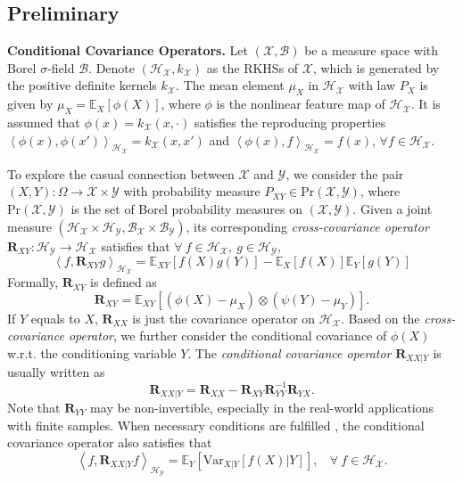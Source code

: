 \documentclass[final]{cvpr}
\newcommand{\MC}{\mathcal}
\newcommand{\MBB}{\mathbb}
\newcommand{\MBF}{\mathbf}
\begin{document}
\subsection{Preliminary}

\textbf{Conditional Covariance Operators. }
Let $(\MC{X},\MC{B})$ be a measure space with Borel $\sigma$-field $\MC{B}$. Denote $(\MC{H}_{\MC{X}},k_{\MC{X}})$ as the RKHSs of $\MC{X}$, which is generated by the positive definite kernels $k_{\MC{X}}$. The mean element $\mu_{X}$ in $\MC{H}_\MC{X}$ with law $P_X$ is given by $\mu_{X} = \MBB{E}_X \left[ \phi(X) \right]$, where $\phi$ is the nonlinear feature map of $\MC{H}_{\MC{X}}$. It is assumed that $\phi(x)=k_{\MC{X}}(x,\cdot)$ satisfies the reproducing properties $\left<\phi(x),\phi(x')\right>_{\MC{H}_{\MC{X}}}=k_{\MC{X}}(x,x')$ and $\left<\phi(x),f\right>_{\MC{H}_{\MC{X}}} = f(x)$, $\forall f \in \MC{H}_{\MC{X}}$.

To explore the casual connection between $\MC{X}$ and $\MC{Y}$, we consider the pair $(X,Y):\Omega \to \MC{X} \times \MC{Y}$ with probability measure $P_{XY}\in \text{Pr}(\MC{X},\MC{Y})$, where $\text{Pr}(\MC{X},\MC{Y})$ is the set of Borel probability measures on $(\MC{X},\MC{Y})$. Given a joint measure $( \MC{H}_{\MC{X}} \times \MC{H}_{\MC{Y}}, \MC{B}_{\MC{X}} \times \MC{B}_{\MC{Y}} )$, its corresponding \textit{cross-covariance operator} \cite{baker1973joint} $\MBF{R}_{XY}: \MC{H}_{\MC{Y}} \to \MC{H}_{\MC{X}}$ satisfies that $\forall ~ f \in \MC{H}_{\MC{X}},~g \in \MC{H}_{\MC{Y}},$
\begin{equation*}\label{eq:cross-covariance_define}
\left< f, \MBF{R}_{XY}g \right>_{\MC{H}_{\MC{X}}} = \MBB{E}_{XY} \left[ f(X)g(Y) \right] - \MBB{E}_X \left[ f(X) \right] \MBB{E}_Y \left[ g(Y) \right]
\end{equation*}
Formally, $\MBF{R}_{XY}$ is defined as \cite{song2009hilbert}
\begin{equation*}\label{eq:cross-covariance_compute}
\MBF{R}_{XY}=\MBB{E}_{XY} \left[ \left( \phi(X) - \mu_{X} \right) \otimes \left( \psi(Y) - \mu_{Y} \right) \right].
\end{equation*}
If $Y$ equals to $X$, $\MBF{R}_{XX}$ is just the covariance operator on $\MC{H}_{\MC{X}}$. Based on the \textit{cross-covariance operator}, we further consider the conditional covariance of $\phi (X)$ w.r.t. the conditioning variable $Y$. The \textit{conditional covariance operator} $\MBF{R}_{XX|Y}$ is usually written as \cite{fukumizu2009kernel}
\begin{equation*}\label{eq:conditional-covariance_compute}
\MBF{R}_{XX|Y} = \MBF{R}_{XX} - \MBF{R}_{XY} \MBF{R}_{YY}^{-1} \MBF{R}_{YX}.
\end{equation*}
Note that $\MBF{R}_{YY}$ may be non-invertible, especially in the real-world applications with finite samples. When necessary conditions are fulfilled \cite{fukumizu2009kernel}, the conditional covariance operator also satisfies that
\begin{equation*}\label{eq:conditional-covariance_property}
\left< f, \MBF{R}_{XX|Y} f \right>_{\MC{H}_{\MC{Y}}} = \MBB{E}_Y \left[ \text{Var}_{X|Y}[f(X)|Y] \right], ~~~~ \forall~ f \in \MC{H}_{\MC{X}}.
\end{equation*}
\end{document}
